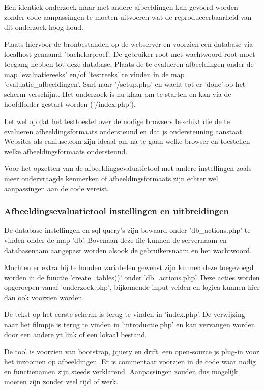 Een identiek onderzoek maar met andere afbeeldingen kan gevoerd worden zonder code aanpassingen te moeten uitvoeren wat de reproduceerbaarheid van dit onderzoek hoog houd. 

Plaats hiervoor de bronbestanden op de webserver en voorzien een database via localhost genaamd 'bachelorproef'. De gebruiker root met wachtwoord root moet toegang hebben tot deze database. Plaats de te evalueren afbeeldingen onder de map 'evaluatiereeks' en/of 'testreeks' te vinden in de map 'evaluatie\_afbeeldingen'. Surf naar '/setup.php' en wacht tot er 'done' op het scherm verschijnt. Het onderzoek is nu klaar om te starten en kan via de hoofdfolder gestart worden ('/index.php').

Let wel op dat het testtoestel over de nodige browsers beschikt die de te evalueren \glspl{afbeeldingsformaat} ondersteund en dat \gls{js} ondersteuning aanstaat. Websites als caniuse.com zijn ideaal om na te gaan welke browser en toestellen welke \glspl{afbeeldingsformaat} ondersteund.

Voor het opzetten van de \gls{afbeeldingsevaluatietool} met andere instellingen zoals meer ondervraagde kenmerken of \glspl{afbeeldingsformaat} zijn echter wel aanpassingen aan de code vereist. 

\subsubsection{Afbeeldingsevaluatietool instellingen en uitbreidingen}
\label{sec:onderzoek-evaluatietool-setup-database}

De database instellingen en \gls{sql} query's zijn bewaard onder 'db\_actions.php' te vinden onder de map 'db'. Bovenaan deze file kunnen de servernaam en databasenaam aangepast worden alsook de gebruikersnaam en het wachtwoord.

Mochten er extra bij te houden variabelen gewenst zijn kunnen deze toegevoegd worden in de functie 'create\_tables()' onder 'db\_actions.php'. Deze acties worden opgeroepen vanaf 'onderzoek.php', bijkomende input velden en logica kunnen hier dan ook voorzien worden.

De tekst op het eerste scherm is terug te vinden in 'index.php'. De verwijzing naar het filmpje is terug te vinden in 'introductie.php' en kan vervangen worden door een andere \gls{yt} link of een lokaal bestand.

De tool is voorzien van \gls{bootstrap}, \gls{jquery} en \gls{drift}, een \gls{open-source} \gls{js} \gls{plug-in} voor het inzoomen op afbeeldingen. Er is commentaar voorzien in de code waar nodig en functienamen zijn steeds verklarend. Aanpassingen zouden dus mogelijk moeten zijn zonder veel tijd of werk.

